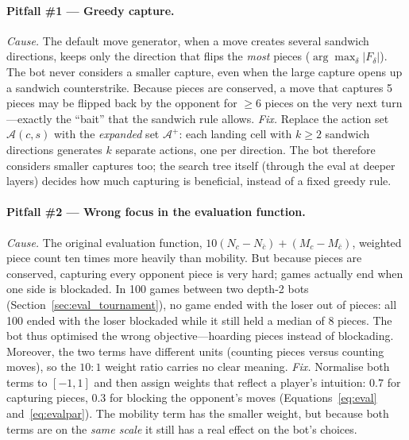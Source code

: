 \paragraph{Pitfall \#1 --- Greedy capture.}
\emph{Cause.} The default move generator, when a move creates several
sandwich directions, keeps only the direction that flips the \emph{most}
pieces ($\arg\max_\delta |F_\delta|$). The bot never considers a smaller
capture, even when the large capture opens up a sandwich counterstrike.
Because pieces are conserved, a move that captures 5 pieces may be flipped
back by the opponent for $\ge 6$ pieces on the very next turn---exactly the
``bait'' that the sandwich rule allows.
\emph{Fix.} Replace the action set $\mathcal A(c,s)$ with the
\emph{expanded} set $\mathcal A^{+}$: each landing cell with $k\ge 2$
sandwich directions generates $k$ separate actions, one per direction. The
bot therefore considers smaller captures too; the search tree itself
(through the eval at deeper layers) decides how much capturing is
beneficial, instead of a fixed greedy rule.

\paragraph{Pitfall \#2 --- Wrong focus in the evaluation function.}
\emph{Cause.} The original evaluation function, $10(N_c-N_{\bar
c})+(M_c-M_{\bar c})$, weighted piece count ten times more heavily than
mobility. But because pieces are conserved, capturing every opponent piece
is very hard; games actually end when one side is blockaded. In 100 games
between two depth-2 bots (Section~\ref{sec:eval_tournament}), no game ended
with the loser out of pieces: all 100 ended with the loser blockaded while it
still held a median of 8 pieces. The bot thus optimised the wrong objective---hoarding pieces
instead of blockading. Moreover, the two terms have different units
(counting pieces versus counting moves), so the $10\!:\!1$ weight ratio
carries no clear meaning.
\emph{Fix.} Normalise both terms to $[-1,1]$ and then assign weights that
reflect a player's intuition: $0.7$ for capturing pieces, $0.3$ for
blocking the opponent's moves (Equations~\eqref{eq:eval}
and~\eqref{eq:evalpar}). The mobility term has the smaller weight,
but because both terms are on the \emph{same scale} it still has a real
effect on the bot's choices.

